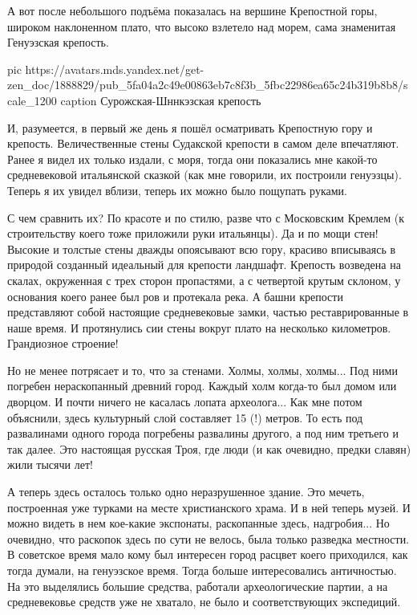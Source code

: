 А вот после небольшого подъёма показалась на вершине Крепостной горы, широком
наклоненном плато, что высоко взлетело над морем, сама знаменитая Генуэзская
крепость.

\ifcmt
  pic https://avatars.mds.yandex.net/get-zen_doc/1888829/pub_5fa04a2c49e00863eb7c8f3b_5fbc22986ea65c24b319b8b8/scale_1200
	caption Сурожская-Шннкэзская крепость
\fi

И, разумеется, в первый же день я пошёл осматривать Крепостную гору и крепость.
Величественные стены Судакской крепости в самом деле впечатляют. Ранее я видел
их только издали, с моря, тогда они показались мне какой-то средневековой
итальянской сказкой (как мне говорили, их построили генуэзцы). Теперь я их
увидел вблизи, теперь их можно было пощупать руками.

С чем сравнить их? По красоте и по стилю, разве что с Мос­ковским Кремлем (к
строительству коего тоже приложили руки ита­льянцы). Да и по мощи стен! Высокие
и толстые стены дважды опоясывают всю гору, красиво вписываясь в природой
созданный идеальный для крепости ланд­шафт. Крепость возведена на скалах,
окруженная с трех сторон про­пастями, а с четвертой крутым склоном, у основания
коего ранее был ров и протекала река. А башни крепости представляют собой
настоящие средневековые замки, частью рес­таврированные в наше время. И
про­тянулись сии стены вокруг плато на несколько километров. Грандиозное
строение!

Но не менее потрясает и то, что за стенами. Холмы, холмы, холмы... Под ними
погребен нераскопанный древний город. Каждый холм когда-то был домом или
дворцом. И почти ничего не касалась лопата археолога... Как мне потом
объяснили, здесь культурный слой составляет 15 (!) метров. То есть под
развалинами одного города погребены развалины другого, а под ним третьего и так
далее. Это настоящая русская Троя, где люди (и как очевидно, предки славян)
жили тысячи лет!

А теперь здесь осталось только одно неразрушенное здание. Это мечеть,
построенная уже турками на месте христианского храма. И в ней теперь музей. И
можно видеть в нем кое-какие экспонаты, раскопанные здесь, надгробия... Но
очевидно, что раскопок здесь по сути не велось, была только разведка местности.
В советское время мало кому был интересен город расцвет коего приходился, как
тогда думали, на генуэзское время. Тогда боль­ше интересовались античностью. На
это выделялись большие средства, работали археологические партии, а на
средневековье средств уже не хва­тало, не было и соответствующих экспедиций.

